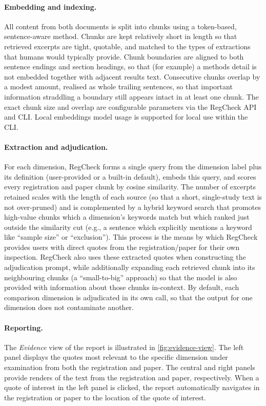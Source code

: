 \documentclass{article}
\begin{document}
\paragraph{Embedding and indexing.} All content from both documents is split
into chunks using a token-based, sentence-aware method. Chunks are kept
relatively short in length so that retrieved excerpts are tight, quotable, and
matched to the types of extractions that humans would typically provide. Chunk
boundaries are aligned to both sentence endings and section headings, so that
(for example) a methods detail is not embedded together with adjacent results
text. Consecutive chunks overlap by a modest amount, realised as whole trailing
sentences, so that important information straddling a boundary still appears
intact in at least one chunk. The exact chunk size and overlap are configurable
parameters via the RegCheck API and CLI. Local embeddings model usage is
supported for local use within the CLI.

\paragraph{Extraction and adjudication.} For each dimension, RegCheck forms a
single query from the dimension label plus its definition (user-provided or a
built-in default), embeds this query, and scores every registration and paper
chunk by cosine similarity. The number of excerpts retained scales with the
length of each source (so that a short, single-study text is not over-pruned)
and is complemented by a hybrid keyword search that promotes high-value chunks
which a dimension's keywords match but which ranked just outside the similarity
cut (e.g., a sentence which explicitly mentions a keyword like ``sample size''
or ``exclusion''). This process is the means by which RegCheck provides users
with direct quotes from the registration/paper for their own inspection.
RegCheck also uses these extracted quotes when constructing the adjudication
prompt, while additionally expanding each retrieved chunk into its neighbouring
chunks (a ``small-to-big'' approach) so that the model is also provided with
information about those chunks in-context. By default, each comparison dimension
is adjudicated in its own call, so that the output for one dimension does not
contaminate another.

\paragraph{Reporting.} The \emph{Evidence} view of the report is illustrated in
\cref{fig:evidence-view}. The left panel displays the quotes most relevant to
the specific dimension under examination from both the registration and paper.
The central and right panels provide renders of the text from the registration
and paper, respectively. When a quote of interest in the left panel is clicked,
the report automatically navigates in the registration or paper to the location
of the quote of interest.
\end{document}

